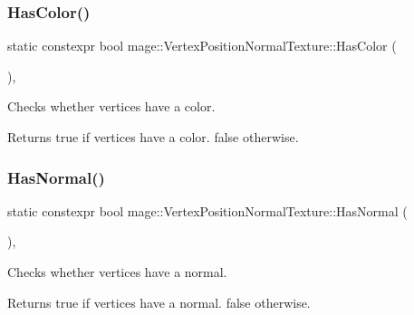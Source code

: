 \subsubsection{\texorpdfstring{Has\+Color()}{HasColor()}}
{\footnotesize\ttfamily static constexpr bool mage\+::\+Vertex\+Position\+Normal\+Texture\+::\+Has\+Color (\begin{DoxyParamCaption}{ }\end{DoxyParamCaption})\hspace{0.3cm}{\ttfamily [static]}, {\ttfamily [noexcept]}}

Checks whether vertices have a color.

\begin{DoxyReturn}{Returns}
{\ttfamily true} if vertices have a color. {\ttfamily false} otherwise. 
\end{DoxyReturn}
\hypertarget{structmage_1_1_vertex_position_normal_texture_a7b7aa7f06f70b0e32ecbc42553ec8a49}{}\label{structmage_1_1_vertex_position_normal_texture_a7b7aa7f06f70b0e32ecbc42553ec8a49} 
\subsubsection{\texorpdfstring{Has\+Normal()}{HasNormal()}}
{\footnotesize\ttfamily static constexpr bool mage\+::\+Vertex\+Position\+Normal\+Texture\+::\+Has\+Normal (\begin{DoxyParamCaption}{ }\end{DoxyParamCaption})\hspace{0.3cm}{\ttfamily [static]}, {\ttfamily [noexcept]}}

Checks whether vertices have a normal.

\begin{DoxyReturn}{Returns}
{\ttfamily true} if vertices have a normal. {\ttfamily false} otherwise. 
\end{DoxyReturn}
\hypertarget{structmage_1_1_vertex_position_normal_texture_ade7641ccc469e344f7df535cc0d870cd}{}\label{structmage_1_1_vertex_position_normal_texture_ade7641ccc469e344f7df535cc0d870cd} 
